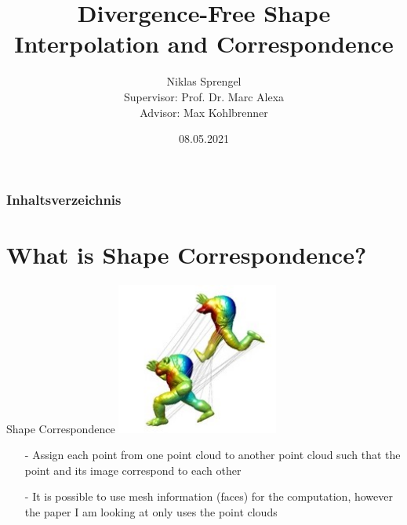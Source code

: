 \documentclass[xcolor=dvipsnames]{beamer}
\title[Divergence-Free Shape Interpolation]{Divergence-Free Shape Interpolation and Correspondence}
\author[CG]{Niklas Sprengel \\ Supervisor: Prof. Dr. Marc Alexa\\Advisor: Max Kohlbrenner}
\institute{TU Berlin}
\date{08.05.2021}
\begin{document}
\begin{frame}
  \titlepage
\end{frame}

\begin{frame}
\frametitle{Inhaltsverzeichnis}
\tableofcontents
\end{frame}

\section{What is Shape Correspondence?}
\begin{frame}{Shape Correspondence}
\includegraphics[height=5cm]{Pictures/ShapeCorrespondenceArmadillo.jpg}
\begin{enumerate}
\item[-] Assign each point from one point cloud to another point cloud such that the point and its image correspond to each other
\item[-] It is possible to use mesh information (faces) for the computation, however the paper I am looking at only uses the point clouds
\end{enumerate}
\end{frame}
\end{document}
